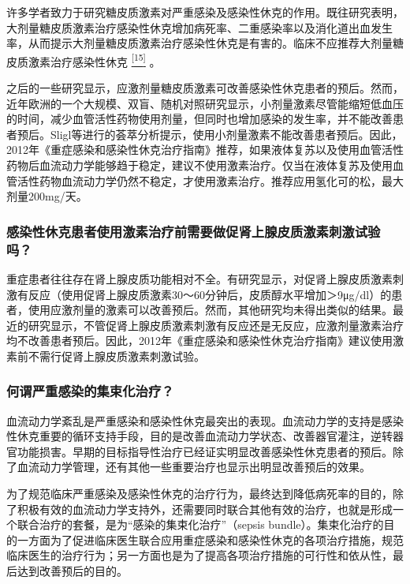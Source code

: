 许多学者致力于研究糖皮质激素对严重感染及感染性休克的作用。既往研究表明，大剂量糖皮质激素治疗感染性休克增加病死率、二重感染率以及消化道出血发生率，从而提示大剂量糖皮质激素治疗感染性休克是有害的。临床不应推荐大剂量糖皮质激素治疗感染性休克
\protect\hyperlink{text00008.htmlux5cux23ch15-7}{\textsuperscript{{[}15{]}}}
。

之后的一些研究显示，应激剂量糖皮质激素可改善感染性休克患者的预后。然而，近年欧洲的一个大规模、双盲、随机对照研究显示，小剂量激素尽管能缩短低血压的时间，减少血管活性药物使用剂量，但同时也增加感染的发生率，并不能改善患者预后。Sligl等进行的荟萃分析提示，使用小剂量激素不能改善患者预后。因此，2012年《重症感染和感染性休克治疗指南》推荐，如果液体复苏以及使用血管活性药物后血流动力学能够趋于稳定，建议不使用激素治疗。仅当在液体复苏及使用血管活性药物血流动力学仍然不稳定，才使用激素治疗。推荐应用氢化可的松，最大剂量200mg/天。

\subsubsection{感染性休克患者使用激素治疗前需要做促肾上腺皮质激素刺激试验吗？}

重症患者往往存在肾上腺皮质功能相对不全。有研究显示，对促肾上腺皮质激素刺激有反应（使用促肾上腺皮质激素30～60分钟后，皮质醇水平增加＞9μg/dl）的患者，使用应激剂量的激素可以改善预后。然而，其他研究均未得出类似的结果。最近的研究显示，不管促肾上腺皮质激素刺激有反应还是无反应，应激剂量激素治疗均不改善患者预后。因此，2012年《重症感染和感染性休克治疗指南》建议使用激素前不需行促肾上腺皮质激素刺激试验。

\subsubsection{何谓严重感染的集束化治疗？}

血流动力学紊乱是严重感染和感染性休克最突出的表现。血流动力学的支持是感染性休克重要的循环支持手段，目的是改善血流动力学状态、改善器官灌注，逆转器官功能损害。早期的目标指导性治疗已经证实明显改善感染性休克患者的预后。除了血流动力学管理，还有其他一些重要治疗也显示出明显改善预后的效果。

为了规范临床严重感染及感染性休克的治疗行为，最终达到降低病死率的目的，除了积极有效的血流动力学支持外，还需要同时联合其他有效的治疗，也就是形成一个联合治疗的套餐，是为“感染的集束化治疗”（sepsis
bundle）。集束化治疗的目的一方面为了促进临床医生联合应用重症感染和感染性休克的各项治疗措施，规范临床医生的治疗行为；另一方面也是为了提高各项治疗措施的可行性和依从性，最后达到改善预后的目的。

